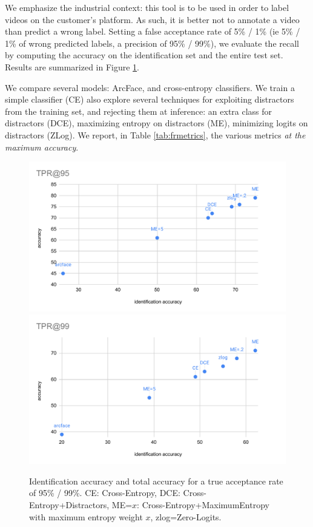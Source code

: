 We emphasize the industrial context: this tool is to be used in order to label videos on the customer's platform. As such, it is better not to annotate a video than predict a wrong label. Setting a false acceptance rate of 5\% / 1\% (ie 5\% / 1\% of wrong predicted labels, a precision of 95\% / 99\%), we evaluate the recall by computing the accuracy on the identification set and the entire test set. Results are summarized in Figure \ref{fig:tpr}.

We compare several models: ArcFace, and cross-entropy classifiers. We train a simple classifier (CE) also explore several techniques for exploiting distractors from the training set, and rejecting them at inference:  an extra class for distractors (DCE), maximizing entropy on distractors (ME), minimizing logits on distractors (ZLog). We report, in Table \ref{tab:frmetrics}, the various metrics \emph{at the maximum accuracy}.

\begin{figure}
    \centering
    \includegraphics[width=\columnwidth]{50-files/TPR@95.pdf}
    \includegraphics[width=\columnwidth]{50-files/TPR@99.pdf}
    \caption{Identification accuracy and total accuracy for a true acceptance rate of 95\% / 99\%. CE: Cross-Entropy, DCE: Cross-Entropy+Distractors, ME=$x$: Cross-Entropy+MaximumEntropy with maximum entropy weight $x$, zlog=Zero-Logits.}

    \label{fig:tpr}
\end{figure}

